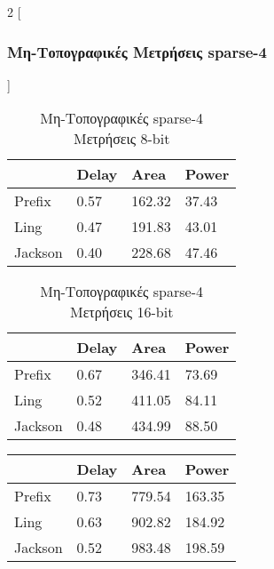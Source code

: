 \begin{multicols}{2}
[\subsubsection{Μη-Τοπογραφικές Μετρήσεις sparse-4}]
\begin{table}[H]
\centering
     \begin{tabular}{||p{1.2cm} | p{0.7cm}  p{1cm}  p{1cm} ||} 
        \hline
         & Delay & Area & Power \\ [0.5ex] 
        \hline\hline
        Prefix  & 0.57  & 162.32    & 37.43 \\ 
        \hline
        Ling    & 0.47  & 191.83    & 43.01 \\
        \hline
        Jackson & 0.40  & 228.68    & 47.46 \\
        \hline
    \end{tabular}
\caption{Μη-Τοπογραφικές sparse-4 Μετρήσεις 8-bit}
\label{sparse4_result_table_8}
\end{table}
\begin{table}[H]
\centering
     \begin{tabular}{||p{1.2cm} | p{0.7cm} p{1cm} p{1cm} ||} 
        \hline
        & Delay & Area & Power \\ [0.5ex] 
        \hline\hline
        Prefix  & 0.67  & 346.41    & 73.69 \\ 
        \hline
        Ling    & 0.52  & 411.05    & 84.11 \\
        \hline
        Jackson & 0.48  & 434.99    & 88.50 \\
        \hline
    \end{tabular}
\caption{Μη-Τοπογραφικές sparse-4 Μετρήσεις 16-bit}
\label{sparse4_result_table_16}
\end{table}
\begin{table}[H]
\centering
     \begin{tabular}{||p{1.2cm} | p{0.7cm} p{1cm} p{1cm} ||} 
        \hline
        & Delay & Area & Power \\ [0.5ex] 
        \hline\hline
        Prefix  & 0.73  & 779.54    & 163.35 \\ 
        \hline
        Ling    & 0.63  & 902.82    & 184.92 \\
        \hline
        Jackson & 0.52  & 983.48    & 198.59 \\

\end{tabular}
\end{table}
\end{multicols}
